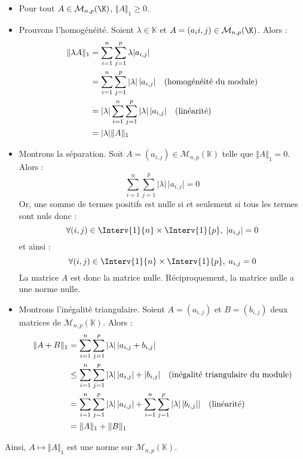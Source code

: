 \documentclass[a4paper,10pt]{report}
\begin{document}
\begin{itemize}
\item Pour tout $A \in \mathcal{M}_{n,p}(\K)$, $\Vert A \Vert_{1} \geq 0$.
\item Prouvons l'homogénéité. Soient $\lambda \in \mathbb{K}$ et $A=(a_i{i,j}) \in \mathcal{M}_{n,p}(\K)$. Alors :
\begin{align*}
\Vert \lambda A \Vert_1 & = \sum_{i = 1}^{n} \sum_{j = 1}^{p} \lambda \vert a_{i,j} \vert \\
& = \sum_{i = 1}^{n} \sum_{j = 1}^{p} \vert \lambda \vert \, \vert a_{i,j} \vert \quad \hbox{(homogénéité du module)} \\
& = \vert \lambda \vert  \sum_{i = 1}^{n} \sum_{j = 1}^{p} \vert \lambda \vert \, \vert a_{i,j} \vert  \quad \hbox{(linéarité)} \\
& = \vert \lambda \vert \Vert A \Vert_1 
\end{align*}
\item Montrons la séparation. Soit $A=(a_{i,j}) \in \mathcal{M}_{n,p}(\mathbb{K})$ telle que $\Vert A \Vert_1=0$. Alors :
$$ \sum_{i = 1}^{n} \sum_{j = 1}^{p} \vert \lambda \vert \, \vert a_{i,j} \vert =0$$
Or, une somme de termes positifs est nulle si et seulement si tous les termes sont nuls donc :
$$ \forall (i,j) \in \Interv{1}{n} \times \Interv{1}{p}, \; \vert a_{i,j} \vert =0$$
et ainsi :
$$  \forall (i,j) \in \Interv{1}{n} \times \Interv{1}{p}, \;  a_{i,j}  =0$$
La matrice $A$ est donc la matrice nulle. Réciproquement, la matrice nulle a une norme nulle.
\item Montrons l'inégalité triangulaire. Soient $A=(a_{i,j})$ et $B=(b_{i,j})$ deux matrices de $\mathcal{M}_{n,p}(\mathbb{K})$. Alors :
\begin{align*}
\Vert A+B \Vert_1 & =  \sum_{i = 1}^{n} \sum_{j = 1}^{p} \vert \lambda \vert \, \vert a_{i,j} +b_{i,j} \vert  \\
& \leq \sum_{i = 1}^{n} \sum_{j = 1}^{p} \vert \lambda \vert \, \vert a_{i,j} \vert + \vert b_{i,j} \vert \quad \hbox{(inégalité triangulaire du module)}  \\
& = \sum_{i = 1}^{n} \sum_{j = 1}^{p} \vert \lambda \vert \, \vert a_{i,j} \vert  + \sum_{i = 1}^{n} \sum_{j = 1}^{p} \vert \lambda \vert \,  \vert b_{i,j} \vert\vert \quad \hbox{(linéarité)} \\
& = \Vert A \Vert_1 + \Vert B \Vert_1 
\end{align*}
\end{itemize}
Ainsi, $A \mapsto \Vert A \Vert_1$ est une norme sur $\mathcal{M}_{n,p}(\mathbb{K})$.
\end{document}
